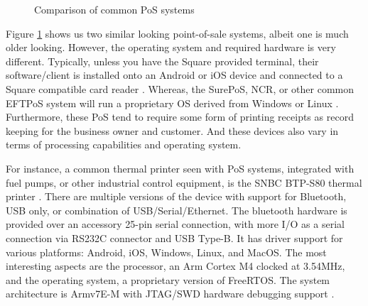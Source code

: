 \begin{figure}[ht]%
  \centering
  \qquad
  \caption{Comparison of common PoS systems}%
  \label{fig:comparison_pos}%
\end{figure}

Figure \ref{fig:comparison_pos} shows us two similar looking point-of-sale systems, albeit one is much older looking. However, the operating system and required hardware is very different. Typically, unless you have the Square provided terminal, their software/client is installed onto an Android or iOS device and connected to a Square compatible card reader \autocite{ondrusMobilePaymentsMarket2011}. Whereas, the SurePoS, NCR, or other common EFTPoS system will run a proprietary OS derived from Windows or Linux \autocite{ebimoboweiROLESOFTWARECASHLESS2018}. Furthermore, these PoS tend to require some form of printing receipts as record keeping for the business owner and customer. And these devices also vary in terms of processing capabilities and operating system.

For instance, a common thermal printer seen with PoS systems, integrated with fuel pumps, or other industrial control equipment, is the SNBC BTP-S80 thermal printer \autocite{SNBCBTPS80Thermala,SNBCNewBeiyangIntelligent}. There are multiple versions of the device with support for Bluetooth, USB only, or combination of USB/Serial/Ethernet. The bluetooth hardware is provided over an accessory 25-pin serial connection, with more I/O as a serial connection via RS232C connector and USB Type-B. It has driver support for various platforms: Android, iOS, Windows, Linux, and MacOS. The most interesting aspects are the processor, an Arm Cortex M4 clocked at 3.54MHz, and the operating system, a proprietary version of FreeRTOS. The system architecture is Armv7E-M with JTAG/SWD hardware debugging support \autocite{CortexM4,FreeRTOSMarketLeading}.

